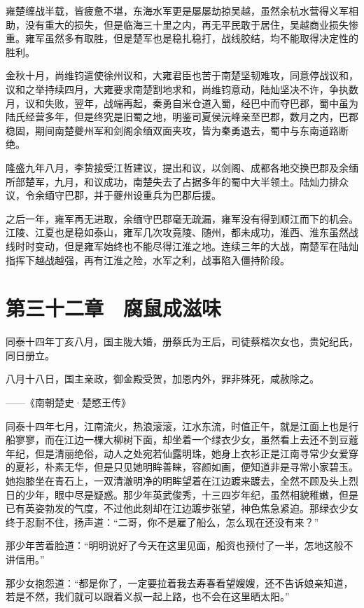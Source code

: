 雍楚缠战半载，皆疲惫不堪，东海水军更是屡屡劫掠吴越，虽然余杭水营得义军相助，没有重大的损失，但是临海三十里之内，再无平民敢于居住，吴越商业损失惨重。雍军虽然多有取胜，但是楚军也是稳扎稳打，战线胶结，均不能取得决定性的胜利。

金秋十月，尚维钧遣使徐州议和，大雍君臣也苦于南楚坚韧难攻，同意停战议和，议和之举持续四月，大雍要求南楚割地求和，尚维钧意动，陆灿坚决不许，争执数月，议和失败，翌年，战端再起，秦勇自米仓道入蜀，经巴中而夺巴郡，蜀中虽为陆氏经营多年，但是终究是旧蜀之地，明鉴司夏侯沅峰亲至巴郡，数月之内，巴郡稳固，期间南楚夔州军和剑阁余缅双面夹攻，皆为秦勇退去，蜀中与东南道路断绝。

隆盛九年八月，李贽接受江哲建议，提出和议，以剑阁、成都各地交换巴郡及余缅所部楚军，九月，和议成功，南楚失去了占据多年的蜀中大半领土。陆灿力排众议，令余缅守巴郡，并于夔州设重兵为巴郡后援。

之后一年，雍军再无进取，余缅守巴郡毫无疏漏，雍军没有得到顺江而下的机会。江陵、江夏也是稳如泰山，雍军几次攻竟陵、随州，都未成功，淮西、淮东虽然战线时时变动，但是雍军始终也不能尽得江淮之地。连续三年的大战，南楚军在陆灿指挥下越战越强，再有江淮之险，水军之利，战事陷入僵持阶段。

\chapter{第三十二章　腐鼠成滋味}

同泰十四年丁亥八月，国主陇大婚，册蔡氏为王后，司徒蔡楷次女也，贵妃纪氏，同日册立。

八月十八日，国主亲政，御金殿受贺，加恩内外，罪非殊死，咸赦除之。

——《南朝楚史·楚愍王传》

同泰十四年七月，江南流火，热浪滚滚，江水东流，时值正午，就是江面上也是行船寥寥，而在江边一棵大柳树下面，却坐着一个绿衣少女，虽然看上去还不到豆蔻年纪，但是清丽绝俗，动人之处宛若仙露明珠，她身上衣衫正是江南寻常少女爱穿的夏衫，朴素无华，但是只见她明眸善睐，容颜如画，便知道非是寻常小家碧玉。她抱膝坐在青石上，一双清澈明净的明眸望着在江边踱来踱去，全然不顾及头上烈日的少年，眼中尽是疑惑。那少年英武俊秀，十三四岁年纪，虽然相貌稚嫩，但是已有英姿勃发的气度，不过他此刻却在江边踱步张望，神色焦急紧迫。那绿衣少女终于忍耐不住，扬声道：“二哥，你不是雇了船么，怎么现在还没有来？”

那少年苦着脸道：“明明说好了今天在这里见面，船资也预付了一半，怎地这般不讲信用。”

那少女抱怨道：“都是你了，一定要拉着我去寿春看望嫂嫂，还不告诉娘亲知道，若是不然，我们就可以跟着义叔一起上路，也不会在这里晒太阳。”

